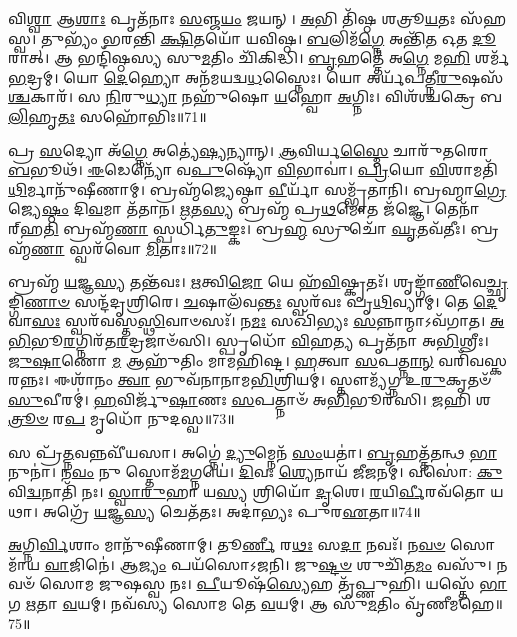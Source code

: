 𑌵𑌿\-\ul{𑌶𑍍𑌵𑌾} 𑌆\-\ul{𑌶𑌾𑌃} 𑌪𑍃𑌤᳴𑌨𑌾𑌃 \ul{𑌸}\-𑌞𑍍𑌜\-\ul{𑌯𑌂} 𑌜𑌯𑌨𑍍।
\-\ul{𑌅}\-𑌭𑌿 𑌤𑌿᳴𑌷𑍍𑌠 𑌶𑌤𑍍𑌰𑍂\-\ul{𑌯}\-𑌤𑌃 𑌸᳴𑌹𑌸𑍍𑌵।
𑌤𑍁𑌭𑍍𑌯𑌂᳴ 𑌭𑌰𑌨𑍍𑌤𑌿 \ul{𑌕𑍍𑌷𑌿}\-𑌤𑌯𑍋᳴ 𑌯𑌵𑌿𑌷𑍍𑌠।
\-\ul{𑌬}\-𑌲𑌿𑌮᳴\-\ul{𑌗𑍍𑌨𑍇} 𑌅𑌨𑍍𑌤𑌿᳴\-\ul{𑌤} 𑌓𑌤 \ul{𑌦𑍂}\-𑌰𑌾𑌤𑍍।
𑌆 𑌭𑌨𑍍𑌦𑌿᳴𑌷𑍍𑌠𑌸𑍍𑌯 𑌸𑍁\-\ul{𑌮}\-𑌤𑌿𑌂 𑌚𑌿᳴𑌕𑌿𑌦𑍍𑌧𑌿।
\-\ul{𑌬𑍃}\-𑌹𑌤𑍍𑌤𑍇᳴ 𑌅\-\ul{𑌗𑍍𑌨𑍇} 𑌮\-\ul{𑌹𑌿} 𑌶𑌰𑍍𑌮᳴ \ul{𑌭}\-𑌦𑍍𑌰𑌮𑍍।
𑌯𑍋 \ul{𑌦𑍇}\-𑌹𑍍𑌯𑍋 𑌅𑌨᳴𑌮𑌯𑌦𑍍𑌵\-\ul{𑌧}\-𑌸𑍍𑌨𑍈𑌃।
𑌯𑍋 𑌅𑌰𑍍𑌯᳴𑌪𑌤𑍍𑌨𑍀\-\ul{𑌰𑍁}\-𑌷𑌸᳴\-\ul{𑌶𑍍𑌚}\-𑌕𑌾𑌰᳴।
𑌸 \ul{𑌨𑌿}\-𑌰𑍁\-\ul{𑌧𑍍𑌯𑌾} 𑌨𑌹𑍁᳴𑌷𑍋 \ul{𑌯}\-𑌹𑍍𑌵𑍋 \ul{𑌅}\-𑌗𑍍𑌨𑌿𑌃।
𑌵𑌿𑌶᳴𑌶𑍍𑌚𑌕𑍍𑌰𑍇 𑌬\-\ul{𑌲𑌿}\-𑌹𑍃\-\ul{𑌤𑌃} 𑌸𑌹𑍋᳴𑌭𑌿𑌃॥71॥

𑌪𑍍𑌰 \ul{𑌸}\-𑌦𑍍𑌯𑍋 𑌅᳴\-\ul{𑌗𑍍𑌨𑍇} 𑌅𑌤𑍍𑌯𑍇॑\-\ul{𑌷𑍍𑌯}\-𑌨𑍍𑌯𑌾𑌨𑍍।
\-\ul{𑌆}\-𑌵𑌿𑌰𑍍𑌯\-\ul{𑌸𑍍𑌮𑍈} 𑌚𑌾𑌰𑍁᳴𑌤𑌰𑍋 \ul{𑌬}\-𑌭𑍂𑌥᳴।
\-\ul{𑌈}\-𑌡𑍇𑌨𑍍𑌯𑍋᳴ 𑌵\-\ul{𑌪𑍁}\-𑌷𑍍𑌯𑍋᳴ \ul{𑌵𑌿}\-𑌭𑌾𑌵𑌾॑।
\-\ul{𑌪𑍍𑌰𑌿}\-𑌯𑍋 \ul{𑌵𑌿}\-𑌶𑌾𑌮𑌤𑌿᳴\-\ul{𑌥𑌿}\-𑌰𑍍𑌮𑌾𑌨𑍁᳴𑌷𑍀𑌣𑌾𑌮𑍍।
𑌬𑍍𑌰𑌹𑍍𑌮᳴𑌜𑍍𑌯𑍇𑌷𑍍𑌠𑌾 \ul{𑌵𑍀}\-𑌰𑍍𑌯𑌾᳴ 𑌸𑌮𑍍𑌭𑍃᳴𑌤𑌾𑌨𑌿।
𑌬𑍍𑌰𑌹𑍍𑌮𑌾\-\ul{𑌗𑍍𑌰𑍇} 𑌜𑍍𑌯𑍇\-\ul{𑌷𑍍𑌠𑌂} 𑌦𑌿\-\ul{𑌵}\-𑌮𑌾 𑌤᳴𑌤𑌾𑌨।
\-\ul{𑌋}\-𑌤\-\ul{𑌸𑍍𑌯} 𑌬𑍍𑌰𑌹𑍍𑌮᳴ 𑌪𑍍𑌰\-\ul{𑌥}\-𑌮𑍋𑌤 𑌜᳴𑌜𑍍𑌞𑍇।
𑌤𑍇𑌨𑌾᳴𑌰𑍍‌\mbox{}𑌹\-\ul{𑌤𑌿} 𑌬𑍍𑌰𑌹𑍍𑌮᳴\-\ul{𑌣𑌾} 𑌸𑍍𑌪𑌰𑍍𑌧𑌿᳴\-\ul{𑌤𑍁}\-𑌙𑍍𑌕𑌃।
𑌬𑍍𑌰\-\ul{𑌹𑍍𑌮} 𑌸𑍍𑌰𑍁𑌚𑍋᳴ \ul{𑌘𑍃}\-𑌤𑌵᳴𑌤𑍀𑌃।
𑌬𑍍𑌰𑌹𑍍𑌮᳴\-\ul{𑌣𑌾} 𑌸𑍍𑌵𑌰᳴𑌵𑍋 \ul{𑌮𑌿}\-𑌤𑌾𑌃॥72॥

𑌬𑍍𑌰𑌹𑍍𑌮᳴ \ul{𑌯}\-𑌜𑍍𑌞\-\ul{𑌸𑍍𑌯} 𑌤𑌨𑍍𑌤᳴𑌵𑌃।
\-\ul{𑌋}\-𑌤𑍍𑌵𑌿\-\ul{𑌜𑍋} 𑌯𑍇 𑌹᳴\-\ul{𑌵𑌿}\-𑌷𑍍𑌕𑍃𑌤𑌃᳴।
𑌶𑍃𑌙𑍍𑌗𑌾᳴\-\ul{𑌣𑍀}\-𑌵𑍇\-\ul{𑌚𑍍𑌛𑍃}\-𑌙𑍍𑌗𑌿\-\ul{𑌣𑌾}\-\-\ul{𑍞} 𑌸𑌨𑍍𑌦᳴𑌦𑍃𑌶𑍍𑌰𑌿𑌰𑍇।
\-\ul{𑌚}\-𑌷𑌾𑌲᳴𑌵\-\ul{𑌨𑍍𑌤𑌃} 𑌸𑍍𑌵𑌰᳴𑌵𑌃 𑌪𑍃\-\ul{𑌥𑌿}\-𑌵𑍍𑌯𑌾𑌮𑍍।
𑌤𑍇 \ul{𑌦𑍇}\-𑌵𑌾\-\ul{𑌸𑌃} 𑌸𑍍𑌵𑌰᳴𑌵𑌸𑍍𑌤\-\ul{𑌸𑍍𑌥𑌿}\-𑌵𑌾𑍞𑌸𑌃᳴।
𑌨\-\ul{𑌮𑌃} 𑌸𑌖𑌿᳴𑌭𑍍𑌯𑌃 \ul{𑌸}\-𑌨𑍍𑌨𑌾𑌨𑍍𑌮𑌾\-𑌽𑌵᳴𑌗𑌾𑌤।
\-\ul{𑌅}\-\-\ul{𑌭𑌿}\-𑌭𑍂\-\ul{𑌰}\-𑌗𑍍𑌨𑌿𑌰᳴𑌤\-\ul{𑌰}\-𑌦𑍍𑌰𑌜𑌾𑍞᳴𑌸𑌿।
𑌸𑍍𑌪𑍃𑌧𑍋᳴ \ul{𑌵𑌿}\-𑌹\-\ul{𑌤𑍍𑌯} 𑌪𑍃𑌤᳴𑌨𑌾 𑌅\-\ul{𑌭𑌿}\-𑌶𑍍𑌰𑍀𑌃।
\-\ul{𑌜𑍁}\-\-\ul{𑌷𑌾}\-𑌣𑍋 \ul{𑌮} 𑌆𑌹𑍁᳴𑌤𑌿𑌂 𑌮𑌾𑌮𑌹𑌿𑌷𑍍𑌟।
\-\ul{𑌹}\-𑌤𑍍𑌵𑌾 \ul{𑌸}\-𑌪\-\ul{𑌤𑍍𑌨𑌾}\-\-\ul{𑌨𑍍} 𑌵𑌰𑌿᳴𑌵𑌸𑍍𑌕𑌰𑌨𑍍𑌨𑌃।
𑌈𑌶𑌾᳴𑌨𑌂 \ul{𑌤𑍍𑌵𑌾} 𑌭𑍁𑌵᳴𑌨𑌾𑌨𑌾𑌮\-\ul{𑌭𑌿}\-𑌶𑍍𑌰𑌿𑌯𑌮𑍍॑।
𑌸𑍍𑌤𑍗𑌮𑍍𑌯᳴𑌗𑍍𑌨 𑌉\-\ul{𑌰𑍁}\-𑌕𑍃𑌤𑍞᳴ \ul{𑌸𑍁}\-𑌵𑍀𑌰𑌮𑍍॑।
\-\ul{𑌹}\-𑌵𑌿𑌰𑍍𑌜𑍁᳴\-\ul{𑌷𑌾}\-𑌣𑌃 \ul{𑌸}\-𑌪𑌤𑍍𑌨𑌾𑍞᳴ 𑌅\-\ul{𑌭𑌿}\-𑌭𑍂𑌰᳴𑌸𑌿।
\-\ul{𑌜}\-𑌹𑌿 𑌶\-\ul{𑌤𑍍𑌰𑍂}\-\-\ul{𑍞} 𑌰\-\ul{𑌪} 𑌮𑍃𑌧𑍋᳴ 𑌨𑍁𑌦𑌸𑍍𑌵॥73॥\anuvakamend[\-\ul{𑌵𑌿}\-𑌶𑌾𑌂 𑌜᳴𑌯𑌾𑌮𑌸𑌿 𑌜𑍀𑌰𑌦𑌾\-\ul{𑌨𑍋} 𑌹\-\ul{𑌰𑍍𑌯𑌾} 𑌵𑌿\-\ul{𑌶𑍍𑌵𑌾} 𑌦𑌿𑌵𑌿᳴𑌷𑍍𑌟𑌿\-\ul{𑌷𑍁} 𑌵𑌸𑍂᳴𑌨𑌿 𑌜𑌿\-\ul{𑌗𑍀}\-𑌵𑌾𑌨𑍍𑌥𑍍𑌸𑌹𑍋᳴𑌭𑌿\-\ul{𑌰𑍍𑌮𑌿}\-𑌤𑌾 𑌨᳴\-\ul{𑌶𑍍𑌚}\-𑌤𑍍𑌵𑌾𑌰𑌿᳴ 𑌚]

𑌸 𑌪𑍍𑌰᳴\-\ul{𑌤𑍍𑌨}\-𑌵𑌨𑍍𑌨𑌵𑍀᳴𑌯𑌸𑌾।
𑌅𑌗𑍍𑌨𑍇॑ \ul{𑌦𑍍𑌯𑍁}\-𑌮𑍍𑌨𑍇𑌨᳴ \ul{𑌸𑌂}\-𑌯𑌤𑌾॑।
\-\ul{𑌬𑍃}\-𑌹𑌤𑍍𑌤᳴𑌤𑌨𑍍𑌥 \ul{𑌭𑌾}\-𑌨𑍁𑌨𑌾॑।
𑌨\-\ul{𑌵𑌂} 𑌨𑍁 𑌸𑍍𑌤𑍋𑌮᳴\-\ul{𑌮}\-𑌗𑍍𑌨𑌯𑍇॑।
\-\ul{𑌦𑌿}\-𑌵𑌃 \ul{𑌶𑍍𑌯𑍇}\-𑌨𑌾𑌯᳴ 𑌜𑍀𑌜𑌨𑌮𑍍।
𑌵𑌸𑍋॑: \ul{𑌕𑍁}\-𑌵𑌿\-\ul{𑌦𑍍𑌵}\-𑌨𑌾𑌤𑌿᳴ 𑌨𑌃।
\-\ul{𑌸𑍍𑌵𑌾}\-\-\ul{𑌰𑍁}\-𑌹𑌾 𑌯\-\ul{𑌸𑍍𑌯} 𑌶𑍍𑌰𑌿𑌯𑍋᳴ \ul{𑌦𑍃}\-𑌶𑍇।
\-\ul{𑌰}\-𑌯𑌿\-\ul{𑌰𑍍𑌵𑍀}\-𑌰𑌵᳴𑌤𑍋 𑌯𑌥𑌾।
𑌅𑌗𑍍𑌰𑍇᳴ \ul{𑌯}\-𑌜𑍍𑌞\-\ul{𑌸𑍍𑌯} 𑌚𑍇𑌤᳴𑌤𑌃।
𑌅𑌦𑌾॑𑌭𑍍𑌯𑌃 𑌪𑍁𑌰\-\ul{𑌏}\-𑌤𑌾॥74॥

\-\ul{𑌅}\-𑌗𑍍𑌨𑌿\-\ul{𑌰𑍍𑌵𑌿}\-𑌶𑌾𑌂 𑌮𑌾𑌨𑍁᳴𑌷𑍀𑌣𑌾𑌮𑍍।
𑌤𑍂\-\ul{𑌰𑍍𑌣𑍀} 𑌰\-\ul{𑌥𑌃} 𑌸\-\ul{𑌦𑌾} 𑌨𑌵𑌃᳴।
𑌨\-\ul{𑌵}\-\-\ul{𑍞} 𑌸𑍋𑌮𑌾᳴𑌯 \ul{𑌵𑌾}\-𑌜𑌿𑌨𑍇॑।
𑌆\-\ul{𑌜𑍍𑌯𑌂} 𑌪𑌯᳴𑌸𑍋𑌽𑌜𑌨𑌿।
𑌜𑍁\-\ul{𑌷𑍍𑌟}\-\-\ul{𑍞} 𑌶𑍁𑌚𑌿᳴𑌤\-\ul{𑌮𑌂} 𑌵𑌸𑍁᳴।
𑌨𑌵𑍞᳴ 𑌸𑍋𑌮 𑌜𑍁𑌷𑌸𑍍𑌵 𑌨𑌃।
\-\ul{𑌪𑍀}\-𑌯𑍂𑌷᳴\-\ul{𑌸𑍍𑌯𑍇}\-𑌹 𑌤𑍃᳴𑌪𑍍𑌣𑍁𑌹𑌿।
𑌯𑌸𑍍𑌤𑍇᳴ \ul{𑌭𑌾}\-𑌗 \ul{𑌋}\-𑌤𑌾 \ul{𑌵}\-𑌯𑌮𑍍।
𑌨𑌵᳴𑌸𑍍𑌯 𑌸𑍋𑌮 𑌤𑍇 \ul{𑌵}\-𑌯𑌮𑍍।
𑌆 𑌸𑍁᳴\-\ul{𑌮}\-𑌤𑌿𑌂 𑌵𑍃᳴𑌣𑍀𑌮𑌹𑍇॥75॥

